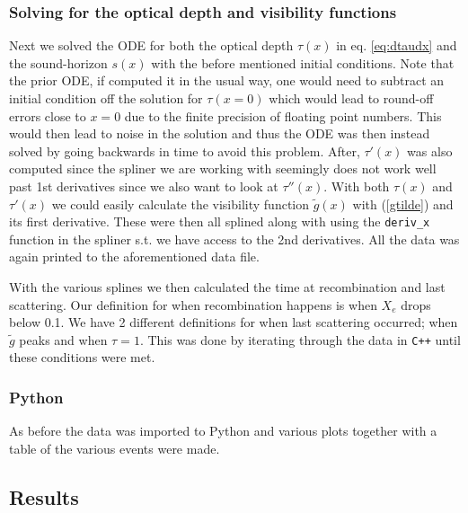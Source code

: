 \documentclass[%
reprint,
 amsmath,amssymb,
 aps,
]{revtex4-2}
\begin{document}
\subsubsection{Solving for the optical depth and visibility functions}
Next we solved the ODE for both the optical depth $\tau(x)$ in eq. \ref{eq:dtaudx} and the sound-horizon $s(x)$ with the before mentioned initial conditions. Note that the prior ODE, if computed it in the usual way, one would need to subtract an initial condition off the solution for $\tau(x=0)$ which would lead to round-off errors close to $x=0$ due to the finite precision of floating point numbers. This would then lead to noise in the solution and thus the ODE was then instead solved by going backwards in time to avoid this problem. After, $\tau'(x)$ was also computed since the spliner we are working with seemingly does not work well past 1st derivatives since we also want to look at $\tau''(x)$. With both $\tau(x)$ and $\tau'(x)$ we could easily calculate the visibility function $\tilde g(x)$ with (\ref{gtilde}) and its first derivative. These were then all splined along with using the \texttt{deriv\_x} function in the spliner s.t. we have access to the 2nd derivatives. All the data was again printed to the aforementioned data file.

With the various splines we then calculated the time at recombination and last scattering. Our definition for when recombination happens is when $X_e$ drops below 0.1. We have 2 different definitions for when last scattering occurred; when $\tilde g$ peaks and when $\tau=1$. This was done by iterating through the data in \texttt{C++} until these conditions were met.

\subsubsection{Python}
As before the data was imported to Python and various plots together with a table of the various events were made.

\subsection{Results}
\end{document}
